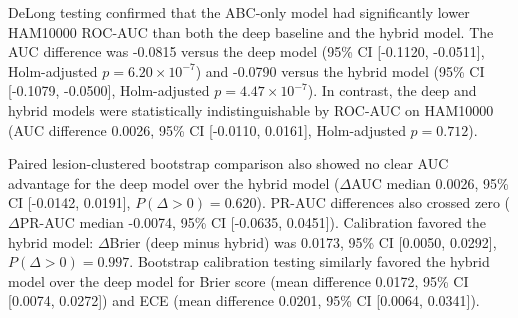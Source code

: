 \documentclass[preprint,12pt]{elsarticle}
\begin{document}
DeLong testing confirmed that the ABC-only model had significantly lower HAM10000 ROC-AUC than both the deep baseline and the hybrid model. The AUC difference was -0.0815 versus the deep model (95\% CI [-0.1120, -0.0511], Holm-adjusted $p=6.20\times10^{-7}$) and -0.0790 versus the hybrid model (95\% CI [-0.1079, -0.0500], Holm-adjusted $p=4.47\times10^{-7}$). In contrast, the deep and hybrid models were statistically indistinguishable by ROC-AUC on HAM10000 (AUC difference 0.0026, 95\% CI [-0.0110, 0.0161], Holm-adjusted $p=0.712$).

Paired lesion-clustered bootstrap comparison also showed no clear AUC advantage for the deep model over the hybrid model ($\Delta$AUC median 0.0026, 95\% CI [-0.0142, 0.0191], $P(\Delta>0)=0.620$). PR-AUC differences also crossed zero ($\Delta$PR-AUC median -0.0074, 95\% CI [-0.0635, 0.0451]). Calibration favored the hybrid model: $\Delta$Brier (deep minus hybrid) was 0.0173, 95\% CI [0.0050, 0.0292], $P(\Delta>0)=0.997$. Bootstrap calibration testing similarly favored the hybrid model over the deep model for Brier score (mean difference 0.0172, 95\% CI [0.0074, 0.0272]) and ECE (mean difference 0.0201, 95\% CI [0.0064, 0.0341]).

\begin{table}[htbp]
\centering
\caption{Ablation: internal (HAM10000 test) and external (BCN20000) performance. The hybrid model outperforms the embeddings-only baseline externally despite being indistinguishable internally, supporting the role of ABC descriptors as a transportability anchor.}
\label{tab:ablation}
\end{table}
\end{document}
